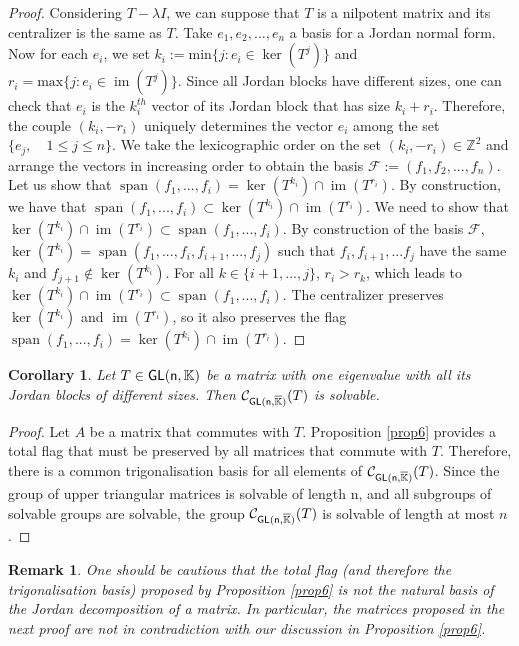 \documentclass[a4paper,11pt]{article}
\newtheorem{corollary}{Corollary}[section]
\newtheorem{remark}{Remark}[section]
\theoremstyle{definition}
\newcommand{\Z}{\mathbb Z}
\newcommand{\C}{\mathcal C}
\newcommand{\K}{\mathbb K}
\newcommand{\im}{\operatorname{im}}
\renewcommand{\span}{\operatorname{span}}
\def \GL{\sf{GL}}
\begin{document}
\begin{proof}
Considering $T-\lambda I$, we can suppose that $T$ is a nilpotent matrix and its centralizer is the same as $T$.
Take $e_1,e_2,...,e_n$ a basis for a Jordan normal form.
Now for each $e_i$, we set $k_i :=\text{min}\{j: e_i \in \ker(T^{j})\} $ and $r_i=\text{max} \{j:e_i \in \im(T^{j})\}$. 
Since all Jordan blocks have different sizes, one can check that $e_i$ is the $k_i^{th}$ vector of its Jordan block that has size $k_i+r_i$.
Therefore, the couple $(k_i,-r_i)$  uniquely determines the vector $e_i$ among the set $\{e_j, \quad 1 \le j\le  n\}$.
We take the lexicographic order on the set $(k_i,-r_i) \in \Z^2$ and arrange the vectors in increasing order to obtain the basis $\mathcal{F}:=(f_1,f_2,...,f_n)$. Let us show that $\span (f_1,...,f_i)=\ker(T^{k_i})\cap \im(T^{r_i})$. \newline
By construction, we have that $\span(f_1,...,f_i) \subset \ker(T^{k_i})\cap \im(T^{r_i})$.
We need to show that $\ker(T^{k_i}) \cap \im(T^{r_i}) \subset \span (f_1,...,f_i)$.
By construction of the basis $\mathcal{F}$, $\ker(T^{k_i})= \span (f_1,...,f_i,f_{i+1},...,f_{j})$ such that $f_i,f_{i+1},...f_j$ have the same $k_i$ and $f_{j+1} \notin \ker(T^{k_i})$. For all $k\in \{i+1,...,j\}$, $r_i> r_k$, which leads to $\ker(T^{k_i}) \cap \im(T^{r_i}) \subset \span (f_1,...,f_i)$.
The centralizer preserves $\ker(T^{k_i})$ and $\im(T^{r_i})$, so it also preserves the flag $\span(f_1,...,f_i)=\ker(T^{k_i}) \cap \im(T^{r_i})$.

\end{proof}

\begin{corollary}\label{cor1}
Let $T\in \GL(n,\K)$ be a matrix with one eigenvalue with all its Jordan blocks of different sizes. Then $\C_{\GL(n,\overline{\K})}(T)$ is solvable.
\end{corollary}

\begin{proof}
Let $A$ be a matrix that commutes with $T$. Proposition \ref{prop6} provides a total flag that must be preserved by all matrices that commute with $T$. Therefore, there is a common trigonalisation basis for all elements of $\C_{\GL(n,\overline{\K})}(T)$. Since the group of upper triangular matrices is solvable of length n, and all subgroups of solvable groups are solvable, the group $\C_{\GL(n,\overline{\K})}(T) $ is solvable of length at most $n$.
\end{proof}

\begin{remark}
One should be cautious that the total flag (and therefore the trigonalisation basis) proposed by Proposition \ref{prop6} is not the natural basis of the Jordan decomposition of a matrix. In particular, the matrices proposed in the next proof are not in contradiction with our discussion in Proposition \ref{prop6}. 
    
\end{remark}
\end{document}
